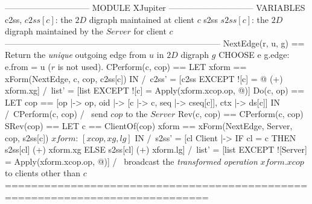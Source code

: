 \documentclass{article}
\begin{document}
\begin{tla}
------------------------------ MODULE XJupiter ------------------------------
VARIABLES c2ss, \* $c2ss[c]$: the $2D$ digraph maintained at client $c$ 
          s2ss  \* $s2ss[c]$: the $2D$ digraph maintained by the $Server$ for client $c$
-----------------------------------------------------------------------------
NextEdge(r, u, g) == \* Return the \emph{unique} outgoing edge from $u$ in $2D$ digraph $g$ 
    CHOOSE e \in g.edge: e.from = u \* ($r$ is not used). 
CPerform(c, cop) == LET xform == xForm(NextEdge, c, cop, c2ss[c])
                    IN  /\ c2ss' = [c2ss EXCEPT ![c] = @ (+) xform.xg]
                        /\ list' = [list EXCEPT ![c] = Apply(xform.xcop.op, @)]
Do(c, op) == LET cop == [op |-> op, oid |-> [c |-> c, seq |-> cseq[c]], ctx |-> ds[c]]
             IN  /\ CPerform(c, cop)
                 /\ \* send $cop$ to the $Server$
Rev(c, cop) == CPerform(c, cop)
SRev(cop) == 
    LET c == ClientOf(cop)
    xform == xForm(NextEdge, Server, cop, s2ss[c]) \* $xform$: $[xcop, xg, lg]$
    IN  /\ s2ss' = [cl \in Client |-> IF cl = c THEN s2ss[cl] (+) xform.xg
                                                ELSE s2ss[cl] (+) xform.lg]
        /\ list' = [list EXCEPT ![Server] = Apply(xform.xcop.op, @)]
        /\ \* broadcast the {\it transformed operation} $xform.xcop$ to clients other than $c$
=============================================================================
\end{tla}
\end{document}

